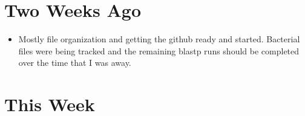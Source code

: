 \documentclass[12pt]{article}
\begin{document}
\bigskip	
	
\section*{Two Weeks Ago}

\begin{itemize} 

\item Mostly file organization and getting the github ready and started. Bacterial 
files were being tracked and the remaining blastp runs should be completed over the
time that I was away. 

\end{itemize}

\section*{This Week}
\end{document}
